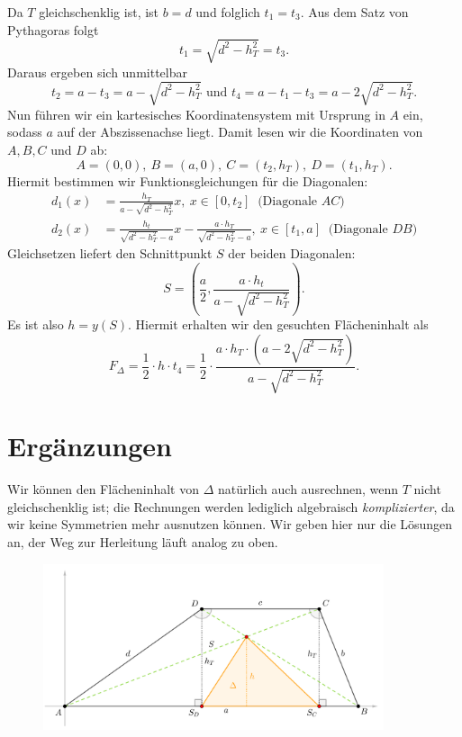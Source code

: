 \documentclass[]{scrartcl}
\begin{document}
\noindent 
Da $T$ gleichschenklig ist, ist $b=d$ und folglich $t_1=t_3$.
Aus dem Satz von Pythagoras folgt 
$$
t_1 = \sqrt{d^2-h_T^2} = t_3.
$$
Daraus ergeben sich unmittelbar
$$
t_2 = a-t_3 = a-\sqrt{d^2-h_T^2} \text{ und } 
t_4 = a-t_1-t_3 = a-2\sqrt{d^2-h_T^2}.
$$
Nun führen wir ein kartesisches Koordinatensystem mit Ursprung in
$A$ ein, sodass $a$ auf der Abszissenachse liegt. Damit lesen wir
die Koordinaten von $A,B,C$ und $D$ ab:
$$
A = (0,0), ~ B = (a,0), ~ C = (t_2,h_T), ~ D = (t_1,h_T).
$$
Hiermit bestimmen wir Funktionsgleichungen für die Diagonalen:
\begin{align*}
d_1(x) &= \frac{h_T}{a-\sqrt{d^2-h_T^2}}x, ~ x \in [0,t_2] ~
\text{ (Diagonale $AC$)}
\\
d_2(x) &= \frac{h_t}{\sqrt{d^2-h_T^2} - a}x - \frac{a\cdot h_T}
{\sqrt{d^2-h_T^2}-a}, ~ x \in [t_1,a] ~ \text{ (Diagonale $DB$)}
\end{align*}
Gleichsetzen liefert den Schnittpunkt $S$ der beiden Diagonalen:
$$
S = \left ( \frac{a}{2}, \frac{a \cdot h_t}{a-\sqrt{d^2-h_T^2}}
 \right ).
$$
Es ist also $h = y(S)$. Hiermit erhalten wir den gesuchten 
Flächeninhalt als
$$
F_\Delta = \frac{1}{2} \cdot h \cdot t_4 =
\frac{1}{2} \cdot \frac{a \cdot h_T \cdot \left ( 
	a - 2\sqrt{d^2-h_T^2} \right )}{a- \sqrt{d^2-h_T^2}}.
$$

\section*{Ergänzungen}
Wir können den Flächeninhalt von $\Delta$ natürlich auch ausrechnen,
wenn $T$ nicht gleichschenklig ist; die Rechnungen werden lediglich
algebraisch \textit{komplizierter}, da wir keine Symmetrien mehr
ausnutzen können. Wir geben hier nur die Lösungen an, der Weg zur 
Herleitung läuft analog zu oben.

\noindent 
\begin{figure}[h]
	\centering
	\includegraphics[width=10cm]{abbildungen/MaKno_3_Figur_2.png}
	\label{fig:2}
\end{figure}
\end{document}
